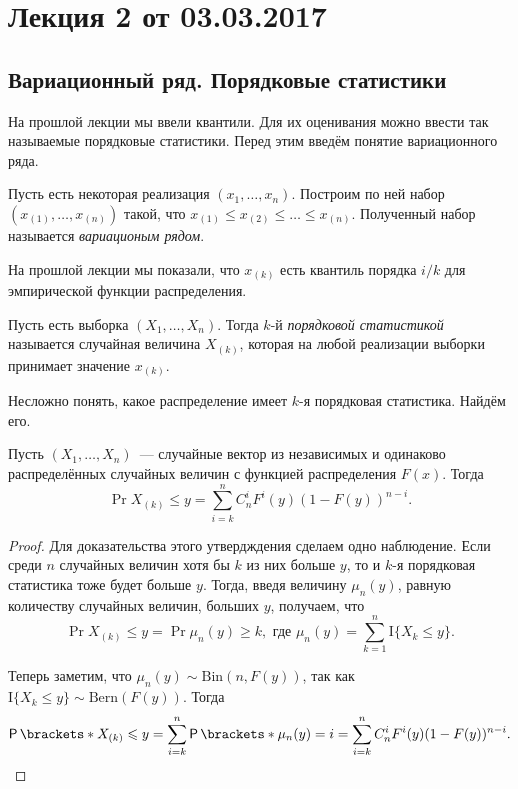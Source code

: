 \section{Лекция 2 от 03.03.2017}
\subsection{Вариационный ряд. Порядковые статистики}
На прошлой лекции мы ввели квантили. Для их оценивания можно ввести так 
называемые порядковые статистики. Перед этим введём понятие вариационного ряда.
\begin{definition}
	Пусть есть некоторая реализация \((x_{1}, \dots, x_{n})\). Построим по ней 
	набор \((x_{(1)}, \dots, x_{(n)})\) такой, что \(x_{(1)} \leq x_{(2)} \leq 
	\dots \leq x_{(n)}\). Полученный набор называется \emph{вариационым 
	рядом}.
\end{definition}
На прошлой лекции мы показали, что \(x_{(k)}\) есть квантиль порядка \(i/k\) 
для эмпирической функции распределения.

\begin{definition}
	Пусть есть выборка \((X_{1}, \dots, X_{n})\). Тогда \(k\)-й 
	\emph{порядковой статистикой} называется случайная величина \(X_{(k)}\), 
	которая на любой реализации выборки принимает значение \(x_{(k)}\).
\end{definition}
Несложно понять, какое распределение имеет \(k\)-я порядковая статистика. 
Найдём его.
\begin{theorem}
	Пусть \((X_{1}, \dots, X_{n})\)~--- случайные вектор из независимых и 
	одинаково распределённых случайных величин с функцией распределения 
	\(F(x)\). Тогда
	\[
		\Pr{X_{(k)} \leq y} = \sum_{i = k}^{n} C_{n}^{i}F^{i}(y)(1 - 
		F(y))^{n - i}.
	\]
\end{theorem}
\begin{proof}
	Для доказательства этого утвердждения сделаем одно наблюдение. Если среди 
	\(n\) случайных величин хотя бы \(k\) из них больше \(y\), то и \(k\)-я 
	порядковая статистика тоже будет больше \(y\). Тогда, введя величину 
	\(\mu_{n}(y)\), равную количеству случайных величин, больших \(y\), 
	получаем, что
	\[
		\Pr{X_{(k)} \leq y} = \Pr{\mu_{n}(y) \geq k}, \text{ где } \mu_{n}(y) = 
		\sum_{k = 1}^{n} \mathrm{I}\{X_{k} \leq y\}.
	\]
	
	Теперь заметим, что \(\mu_{n}(y) \sim \mathrm{Bin}(n, F(y))\), так как 
	\(\mathrm{I}\{X_{k} \leq y\} \sim \mathrm{Bern}(F(y))\). Тогда 
	\[
		\Pr{X_{(k)} \leq y} = \sum_{i = k}^{n} \Pr{\mu_{n}(y) = i} = \sum_{i = 
		k}^{n} C_{n}^{i}F^{i}(y)(1 - F(y))^{n - i}. \qedhere
	\]
\end{proof}

